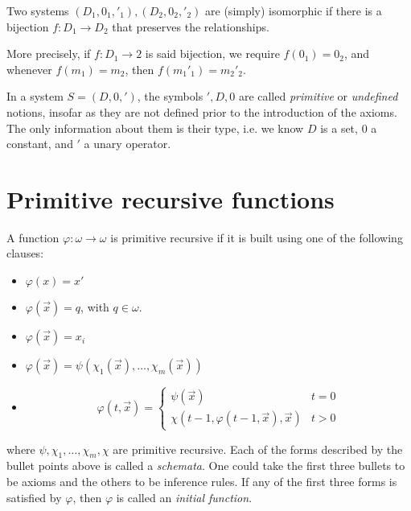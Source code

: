\documentclass[a4paper, 12pt]{article}
\begin{document}
\begin{definition}
    Two systems $(D_1, 0_1, '_1), (D_2, 0_2, '_2)$ are (simply) isomorphic 
    if there is a bijection $f : D_1 \to D_2$ that preserves the 
    relationships.
\end{definition}

More precisely, if $f : D_1 \to 2$ is said bijection, we require $f(0_1) = 0_2$,
and whenever $f(m_1) = m_2$, then $f(m_1'_1) = m_2'_2$.

In a system $S = (D, 0, ')$, the symbols $', D, 0$ are called \textit{primitive}
or \textit{undefined} notions, insofar as they are not defined prior to 
the introduction of the axioms. The only information about them is their 
type, i.e. we know $D$ is a set, $0$ a constant, and $'$ a unary operator.

\pagebreak

\section{Primitive recursive functions}

A function $\varphi : \omega \to \omega$ is primitive recursive if it is built 
using one of the following clauses: 

\begin{itemize}
    \item $\varphi(x) = x'$
    \item $\varphi(\overrightarrow{x}) = q$, with $q \in \omega$.
    \item $\varphi(\overrightarrow{x}) = x_i$
    \item $\varphi(\overrightarrow{x}) = \psi \left( \chi_1(\overrightarrow{x}),\ldots, \chi_m (\overrightarrow{x}) \right) $ 
    \item \begin{equation*}
        \varphi(t, \overrightarrow{x}) = \begin{cases}
            \psi(\overrightarrow{x}) & t = 0 \\ 
            \chi(t - 1, \varphi(t-1, \overrightarrow{x}), \overrightarrow{x}) & t > 0
        \end{cases}
    \end{equation*}
\end{itemize}

where $\psi, \chi_1, \ldots, \chi_m, \chi$ are primitive recursive. Each of the 
forms described by the bullet points above is called a \textit{schemata}.
One could take the first three bullets to be axioms and the others to be 
inference rules. If any of the first three forms is satisfied by $\varphi$,
then $\varphi$ is called an \textit{initial function}. 
\end{document}
